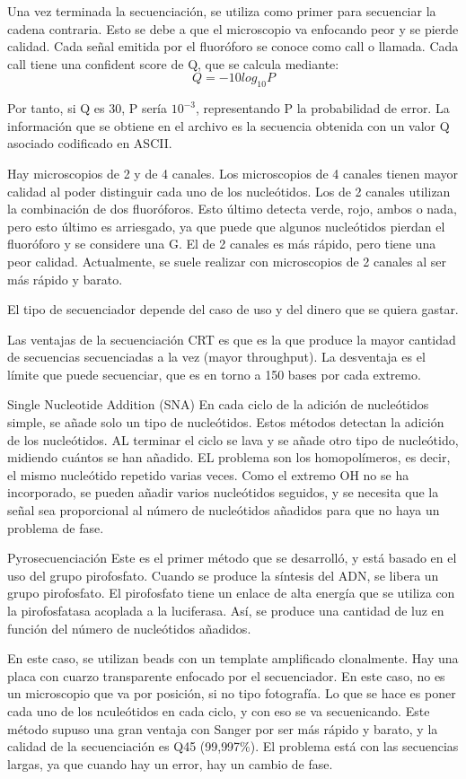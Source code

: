 Una vez terminada la secuenciación, se utiliza como primer para secuenciar la cadena contraria. Esto se debe a que el microscopio va enfocando peor y se pierde calidad. Cada señal emitida por el fluoróforo se conoce como call o llamada. Cada call tiene una confident score de Q, que se calcula mediante:
$$Q = - 10 log_{10} P $$

Por tanto, si Q es 30, P sería $10^{-3}$, representando P la probabilidad de error. La información que se obtiene en el archivo es la secuencia obtenida con un valor Q asociado codificado en ASCII. 

Hay microscopios de 2 y de 4 canales. Los microscopios de 4 canales tienen mayor calidad al poder distinguir cada uno de los nucleótidos. Los de 2 canales utilizan la combinación de dos fluoróforos. Esto último detecta verde, rojo, ambos o nada, pero esto último es arriesgado, ya que puede que algunos nucleótidos pierdan el fluoróforo y se considere una G. El de 2 canales es más rápido, pero tiene una peor calidad. Actualmente, se suele realizar con microscopios de 2 canales al ser más rápido y barato.

El tipo de secuenciador depende del caso de uso y del dinero que se quiera gastar. 

Las ventajas de la secuenciación CRT es que es la que produce la mayor cantidad de secuencias secuenciadas a la vez (mayor throughput). La desventaja es el límite que puede secuenciar, que es en torno a 150 bases por cada extremo. 

Single Nucleotide Addition (SNA)
En cada ciclo de la adición de nucleótidos simple, se añade solo un tipo de nucleótidos. Estos métodos detectan la adición de los nucleótidos. AL terminar el ciclo se lava y se añade otro tipo de nucleótido, midiendo cuántos se han añadido. EL problema son los homopolímeros, es decir, el mismo nucleótido repetido varias veces. Como el extremo OH no se ha incorporado, se pueden añadir varios nucleótidos seguidos, y se necesita que la señal sea proporcional al número de nucleótidos añadidos para que no haya un problema de fase.

Pyrosecuenciación
Este es el primer método que se desarrolló, y está basado en el uso del grupo pirofosfato. Cuando se produce la síntesis del ADN, se libera un grupo pirofosfato. El pirofosfato tiene un enlace de alta energía que se utiliza con la pirofosfatasa acoplada a la luciferasa. Así, se produce una cantidad de luz en función del número de nucleótidos añadidos. 

En este caso, se utilizan beads con un template amplificado clonalmente. Hay una placa con cuarzo transparente enfocado por el secuenciador. En este caso, no es un microscopio que va por posición, si no tipo fotografía. Lo que se hace es poner cada uno de los nculeótidos en cada ciclo, y con eso se va secuenicando. Este método supuso una gran ventaja con Sanger por ser más rápido y barato, y la calidad de la secuenciación es Q45 (99,997\%). El problema está con las secuencias largas, ya que cuando hay un error, hay un cambio de fase. 

